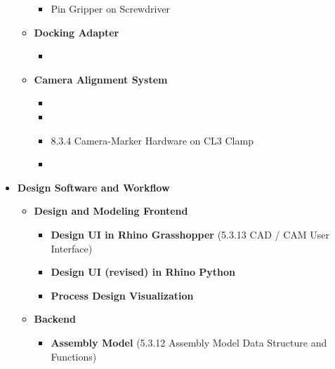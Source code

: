 \begin{itemize}
\begin{itemize}
\begin{itemize}
	\item Pin Gripper on Screwdriver 

\end{itemize}
	\item \textbf{Docking Adapter}

\begin{itemize}
	\item {}

\end{itemize}
	\item \textbf{Camera Alignment System}

\begin{itemize}
	\item {}

	\item {}

	\item 8.3.4 Camera-Marker Hardware on CL3 Clamp

	\item {}

\end{itemize}
\end{itemize}
	\item \textbf{Design Software and Workflow}

\begin{itemize}
	\item \textbf{Design and Modeling Frontend}

\begin{itemize}
	\item \textbf{Design UI in Rhino Grasshopper} (5.3.13 CAD / CAM User Interface)

	\item \textbf{Design UI (revised) in Rhino Python } 

	\item \textbf{Process Design Visualization} 

\end{itemize}
	\item \textbf{Backend}

\begin{itemize}
	\item \textbf{Assembly Model} (5.3.12 Assembly Model Data Structure and Functions)


\end{itemize}
\end{itemize}
\end{itemize}
